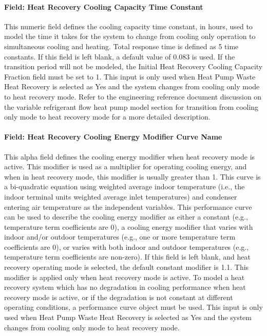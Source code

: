 \paragraph{Field: Heat Recovery Cooling Capacity Time Constant}\label{field-heat-recovery-cooling-capacity-time-constant}

This numeric field defines the cooling capacity time constant, in hours, used to model the time it takes for the system to change from cooling only operation to simultaneous cooling and heating. Total response time is defined as 5 time constants. If this field is left blank, a default value of 0.083 is used. If the transition period will not be modeled, the Initial Heat Recovery Cooling Capacity Fraction field must be set to 1. This input is only used when Heat Pump Waste Heat Recovery is selected as Yes and the system changes from cooling only mode to heat recovery mode. Refer to the engineering reference document discussion on the variable refrigerant flow heat pump model section for transition from cooling only mode to heat recovery mode for a more detailed description.

\paragraph{Field: Heat Recovery Cooling Energy Modifier Curve Name}\label{field-heat-recovery-cooling-energy-modifier-curve-name}

This alpha field defines the cooling energy modifier when heat recovery mode is active. This modifier is used as a multiplier for operating cooling energy, and when in heat recovery mode, this modifier is usually greater than 1. This curve is a bi-quadratic equation using weighted average indoor temperature (i.e., the indoor terminal units weighted average inlet temperatures) and condenser entering air temperature as the independent variables. This performance curve can be used to describe the cooling energy modifier as either a constant (e.g., temperature term coefficients are 0), a cooling energy modifier that varies with indoor and/or outdoor temperatures (e.g., one or more temperature term coefficients are 0), or varies with both indoor and outdoor temperatures (e.g., temperature term coefficients are non-zero). If this field is left blank, and heat recovery operating mode is selected, the default constant modifier is 1.1. This modifier is applied only when heat recovery mode is active. To model a heat recovery system which has no degradation in cooling performance when heat recovery mode is active, or if the degradation is not constant at different operating conditions, a performance curve object must be used. This input is only used when Heat Pump Waste Heat Recovery is selected as Yes and the system changes from cooling only mode to heat recovery mode.

